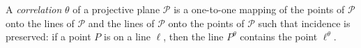 A \emph{correlation} $\theta$ of a projective plane $\mathcal{P}$ is a one-to-one mapping of the points of $\mathcal{P}$ onto the lines of $\mathcal{P}$ and the lines of $\mathcal{P}$ onto the points of $\mathcal{P}$ such that incidence is preserved: if a point $P$ is on a line $\ell$, then the line $P^\theta$ contains the point $\ell^\theta$.
